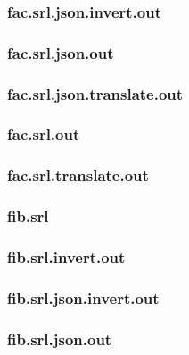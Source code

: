 \subsubsection{fac.srl.json.invert.out}
\label{app:fac_srl.json.invert.out}

\subsubsection{fac.srl.json.out}
\label{app:fac_srl.json.out}

\subsubsection{fac.srl.json.translate.out}
\label{app:fac_srl.json.translate.out}

\subsubsection{fac.srl.out}
\label{app:fac_srl.out}

\subsubsection{fac.srl.translate.out}
\label{app:fac_srl.translate.out}

\subsubsection{fib.srl}
\label{app:fib_srl}

\subsubsection{fib.srl.invert.out}
\label{app:fib_srl.invert.out}

\subsubsection{fib.srl.json.invert.out}
\label{app:fib_srl.json.invert.out}

\subsubsection{fib.srl.json.out}
\label{app:fib_srl.json.out}

